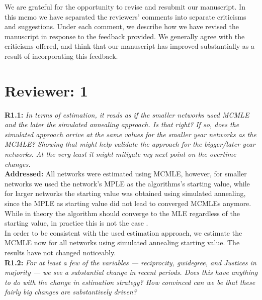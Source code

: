 \documentclass[a4paper,11pt]{texMemo}
\begin{document}
\maketitle

\noindent We are grateful for the opportunity to revise and resubmit our manuscript. In this memo
we have separated the reviewers' comments into separate criticisms and
suggestions. Under each comment, we describe how we have revised the manuscript in
response to the feedback provided. We generally agree with the criticisms offered, and think
that our manuscript has improved substantially as a result of incorporating this feedback. 



\section*{Reviewer: 1}

\noindent \textbf{R1.1:} \emph{ In terms of estimation, it reads as if the smaller networks used MCMLE and the later the simulated annealing approach. Is that right? If so, does the simulated approach arrive at the same values for the smaller year networks as the MCMLE? Showing that might help validate the approach for the bigger/later year networks. At the very least it might mitigate my next point on the overtime changes.   }\\

\noindent \textbf{Addressed:} All networks were estimated using MCMLE, however, for smaller networks we used the network's MPLE as the algorithms's starting value, while for larger networks the starting value was obtained using simulated annealing, since the MPLE as starting value did not lead to converged MCMLEs anymore. While in theory the algorithm should converge to the MLE regardless of the starting value, in practice this is not the case   \cite{hummel2012improving}. \\
In order to be consistent with the used estimation approach, we estimate the MCMLE now for all networks using simulated annealing starting value. The results have not changed noticeably.  \\

\noindent  \textbf{R1.2:} \emph{ For at least a few of the variables --- reciprocity, gwidegree, and Justices in majority --- we see a substantial change in recent periods. Does this have anything to do with the change in estimation strategy? How convinced can we be that these fairly big changes are substantively driven? }\\
\end{document}
